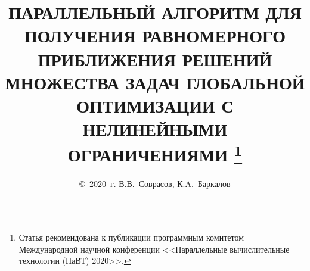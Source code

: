 \documentclass{cmi}
\begin{document}

\renewcommand*{\thefootnote}{\fnsymbol{footnote}} %


\title{ПАРАЛЛЕЛЬНЫЙ АЛГОРИТМ ДЛЯ ПОЛУЧЕНИЯ РАВНОМЕРНОГО ПРИБЛИЖЕНИЯ
РЕШЕНИЙ МНОЖЕСТВА ЗАДАЧ ГЛОБАЛЬНОЙ ОПТИМИЗАЦИИ С НЕЛИНЕЙНЫМИ ОГРАНИЧЕНИЯМИ
\footnote{Статья рекомендована к публикации программным комитетом Международной
научной конференции <<Параллельные вычислительные технологии (ПаВТ) 2020>>.}%
}

\author{\copyright~2020~г. В.В.~Соврасов, К.A.~Баркалов}



\address{Нижегородский государственный университет им. Н.И.~Лобачевского\\
  (603022 Нижний Новгород, пр.~Гагарина, д.~23, к.~2)}



\maketitle{}


\renewcommand*{\thefootnote}{\arabic{footnote}}
\setcounter{footnote}{0}
\end{document}
